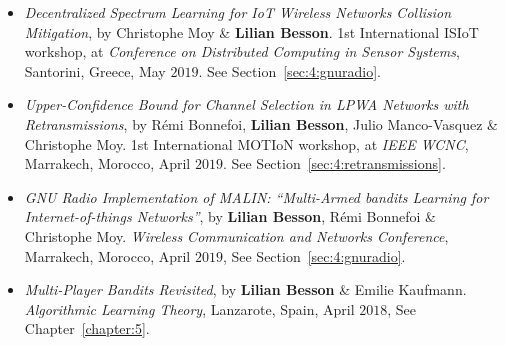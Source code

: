 \begin{itemize}
\item
    \emph{Decentralized Spectrum Learning for IoT Wireless Networks Collision Mitigation},
    by Christophe Moy \& \textbf{Lilian Besson}.
    1st International ISIoT workshop,
    at \emph{Conference on Distributed Computing in Sensor Systems},
    Santorini, Greece, May $2019$.
    See Section~\ref{sec:4:gnuradio}.
    \cite{MoyBesson2019}


\item
    \emph{Upper-Confidence Bound for Channel Selection in LPWA Networks with Retransmissions},
    by Rémi Bonnefoi, \textbf{Lilian Besson}, Julio Manco-Vasquez \& Christophe Moy.
    1st International MOTIoN workshop,
    at \emph{IEEE WCNC}, Marrakech, Morocco, April $2019$.
    See Section~\ref{sec:4:retransmissions}.
    \cite{Bonnefoi2019WCNC}

\item
    \emph{GNU Radio Implementation of MALIN: ``Multi-Armed bandits Learning for Internet-of-things Networks''},
    by \textbf{Lilian Besson}, Rémi Bonnefoi \& Christophe Moy.
    \emph{Wireless Communication and Networks Conference},
    Marrakech, Morocco, April $2019$,
    See Section~\ref{sec:4:gnuradio}.
    \cite{Besson2019WCNC}

\item
    \emph{Multi-Player Bandits Revisited},
    by \textbf{Lilian Besson} \& Emilie Kaufmann.
    \emph{Algorithmic Learning Theory},
    Lanzarote, Spain, April $2018$,
    See Chapter~\ref{chapter:5}.
    \cite{Besson2018ALT}


\end{itemize}
